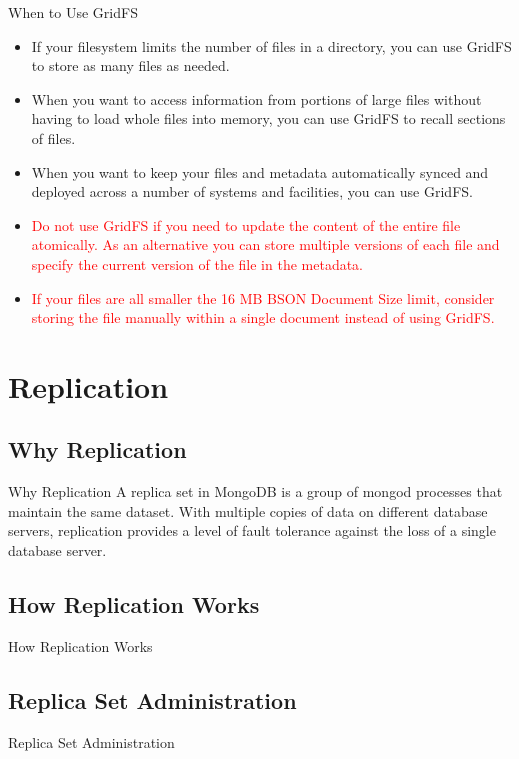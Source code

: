 \documentclass{beamer}
\begin{document}
\begin{frame}{When to Use GridFS}
    \begin{itemize}
        \item If your filesystem limits the number of files in a directory, you can use GridFS to store as many files as needed.
        \item When you want to access information from portions of large files without having to load whole files into memory, you can use GridFS to recall sections of files.
        \item When you want to keep your files and metadata automatically synced and deployed across a number of systems and facilities, you can use GridFS.
        \item \textcolor{red}{Do not use GridFS if you need to update the content of the entire file atomically. As an alternative you can store multiple versions of each file and specify the current version of the file in the metadata. }
        \item \textcolor{red}{If your files are all smaller the 16 MB BSON Document Size limit, consider storing the file manually within a single document instead of using GridFS.}
    \end{itemize}
\end{frame}

\section{Replication}
\subsection{Why Replication}
\begin{frame}{Why Replication}
    A replica set in MongoDB is a group of mongod processes that maintain the same dataset. With multiple copies of data on different database servers, replication provides a level of fault tolerance against the loss of a single database server.
\end{frame}

\subsection{How Replication Works}
\begin{frame}{How Replication Works}
    
\end{frame}

\subsection{Replica Set Administration}
\begin{frame}{Replica Set Administration}
    
\end{frame}
\end{document}
